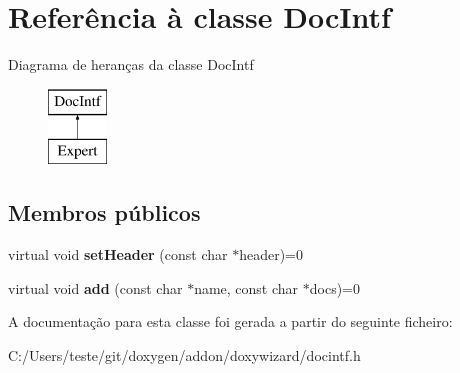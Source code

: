 \hypertarget{class_doc_intf}{\section{Referência à classe Doc\-Intf}
\label{class_doc_intf}
}
Diagrama de heranças da classe Doc\-Intf\begin{figure}[H]
\begin{center}
\leavevmode
\includegraphics[height=2.000000cm]{class_doc_intf}
\end{center}
\end{figure}
\subsection*{Membros públicos}
\begin{DoxyCompactItemize}
\item 
\hypertarget{class_doc_intf_a16cc97f95e9979252a839b120e602c09}{virtual void {\bfseries set\-Header} (const char $\ast$header)=0}\label{class_doc_intf_a16cc97f95e9979252a839b120e602c09}

\item 
\hypertarget{class_doc_intf_a706df1d9f991b775563fc642219d90d5}{virtual void {\bfseries add} (const char $\ast$name, const char $\ast$docs)=0}\label{class_doc_intf_a706df1d9f991b775563fc642219d90d5}

\end{DoxyCompactItemize}


A documentação para esta classe foi gerada a partir do seguinte ficheiro\-:\begin{DoxyCompactItemize}
\item 
C\-:/\-Users/teste/git/doxygen/addon/doxywizard/docintf.\-h\end{DoxyCompactItemize}
